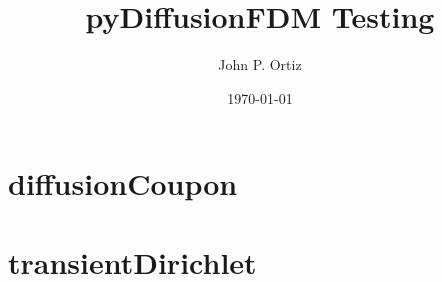 \documentclass{article}
\title{pyDiffusionFDM Testing}
\author{John P. Ortiz}
\date{\today}
\begin{document}
\maketitle
\section{diffusionCoupon}

\clearpage
\section{transientDirichlet}

\clearpage
\end{document}
